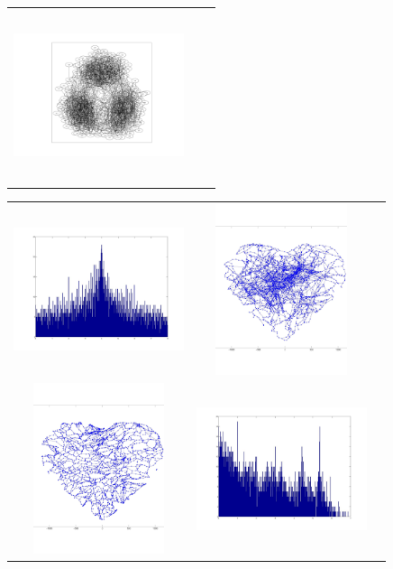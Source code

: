 \begin{tabular}{ |c|c|c| }
\includegraphics[width=5.0cm,height=5.0cm]{images/WellConnectedWithThreeClusters3.jpg}
\end{tabular}


\begin{tabular}{ |c|c|c| }
\includegraphics[width=5.0cm,height=5.0cm]{images/60_50_grid_graph_spectra.jpg} &
\includegraphics[width=5.0cm,height=5.0cm]{images/RoadNetwork_Scalefree_100v_c2.jpg} \\
\includegraphics[width=5.0cm,height=5.0cm]{images/GursoyAtunScaleFreeAB.jpg} &
\includegraphics[width=5.0cm,height=5.0cm]{images/spectra_minnesotaRoad_network.jpg}
\end{tabular}




